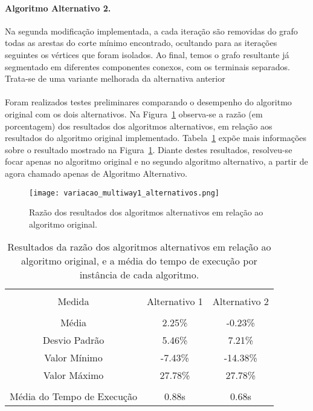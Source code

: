 \documentclass[12pt, a4paper]{article}
\begin{document}
\paragraph{Algoritmo Alternativo 2.} Na segunda modificação implementada, a cada iteração são removidas do grafo todas as arestas do corte mínimo encontrado, ocultando para as iterações seguintes os vértices que foram isolados. Ao final, temos o grafo resultante já segmentado em diferentes componentes conexos, com os terminais separados. Trata-se de uma variante melhorada da alternativa anterior

\paragraph{}
Foram realizados testes preliminares comparando o desempenho do algoritmo original com os dois alternativos.
Na Figura~\ref{fig:variacao_alternativos} observa-se a razão (em porcentagem) dos resultados dos algoritmos alternativos, em relação aos resultados do algoritmo original implementado.
Tabela~\ref{tab:resultados_variancia_alternativos} expõe mais informações sobre o resultado mostrado na Figura~\ref{fig:variacao_alternativos}.
Diante destes resultados, resolveu-se focar apenas no algoritmo original e no segundo algoritmo alternativo, a partir de agora chamado apenas de Algoritmo Alternativo.

\begin{figure}[!htb]
\centering
\texttt{[image: variacao\_multiway1\_alternativos.png]}
\caption{Razão dos resultados dos algoritmos alternativos em relação ao algoritmo original.}
\label{fig:variacao_alternativos}
\end{figure}

\begin{table}[ht]
\centering %
\begin{tabular}{c c c} %
\hline \\[-2ex]
Medida & Alternativo 1 & Alternativo 2\\ [0.5ex] 
\hline \\[-1.5ex]
Média & 2.25\% & -0.23\% \\ 
Desvio Padrão & 5.46\% & 7.21\% \\ 
Valor Mínimo & -7.43\% & -14.38\% \\ 
Valor Máximo & 27.78\% & 27.78\% \\ [1ex] %
\hline \\[-2ex]
Média do Tempo de Execução & 0.88s & 0.68s\\ [1ex] 
\hline
\end{tabular}
\caption{Resultados da razão dos algoritmos alternativos em relação ao algoritmo original, e a média do tempo de execução por instância de cada algoritmo.}
\label{tab:resultados_variancia_alternativos}
\end{table}
\end{document}
